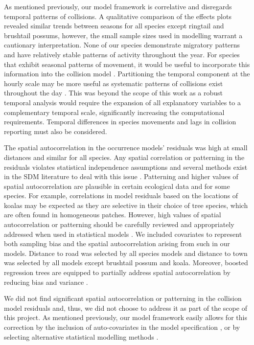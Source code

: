 As mentioned previously, our model framework is correlative and disregards temporal patterns of collisions.  A qualitative comparison of the effects plots revealed similar trends between seasons for all species except ringtail and brushtail possums, however, the small sample sizes used in modelling warrant a cautionary interpretation. None of our species demonstrate migratory patterns and have relatively stable patterns of activity throughout the year. For species that exhibit seasonal patterns of movement, it would be useful to incorporate this information into the collision model \citep[see][]{neum12}. Partitioning the temporal component at the hourly scale may be more useful as systematic patterns of collisions exist throughout the day \citep[e.g.][]{litv08,rhod14}. This was beyond the scope of this work as a robust temporal analysis would require the expansion of all explanatory variables to a complementary temporal scale, significantly increasing the computational requirements.  Temporal differences in species movements and lags in collision reporting must also be considered.

The spatial autocorrelation in the occurrence models' residuals was high at small distances and similar for all species.  Any spatial correlation or patterning in the residuals violates statistical independence assumptions and several methods exist in the SDM literature to deal with this issue \citep{augu96,dorm07,dorm13}.  Patterning and higher values of spatial autocorrelation are plausible in certain ecological data and for some species.  For example, correlations in model residuals based on the locations of koalas may be expected as they are selective in their choice of tree species, which are often found in homogeneous patches.  However, high values of spatial autocorrelation or patterning should be carefully reviewed and appropriately addressed when used in statistical models \citep{wint06}.  We included covariates to represent both sampling bias and the spatial autocorrelation arising from such in our models.  Distance to road was selected by all species models and distance to town was selected by all models except brushtail possum and koala.  Moreover, boosted regression trees are equipped to partially address spatial autocorrelation by reducing bias and variance \citep{elit08}.

We did not find significant spatial autocorrelation or patterning in the collision model residuals and, thus, we did not choose to address it as part of the scope of this project.  As mentioned previously, our model framework easily allows for this correction by the inclusion of auto-covariates in the model specification \citep[e.g.][]{dwye16,farm12,gome08}, or by selecting alternative statistical modelling methods \citep{zhan05}.

